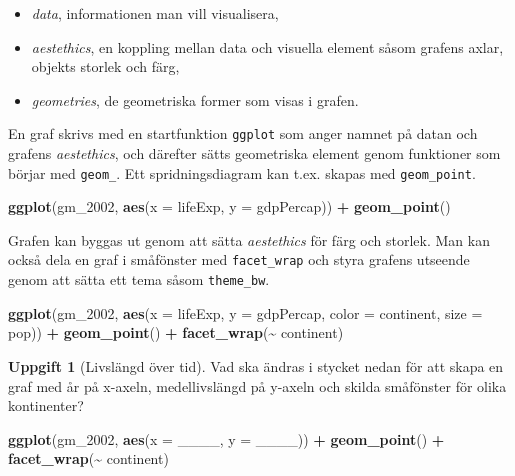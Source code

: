\documentclass[
]{book}
\newenvironment{Shaded}{\begin{snugshade}}{\end{snugshade}}
\newcommand{\AttributeTok}[1]{\textcolor[rgb]{0.13,0.29,0.53}{#1}}
\newcommand{\FunctionTok}[1]{\textcolor[rgb]{0.13,0.29,0.53}{\textbf{#1}}}
\newcommand{\NormalTok}[1]{#1}
\newcommand{\SpecialCharTok}[1]{\textcolor[rgb]{0.81,0.36,0.00}{\textbf{#1}}}
\providecommand{\tightlist}{%
  \setlength{\itemsep}{0pt}\setlength{\parskip}{0pt}}
\theoremstyle{definition}
\theoremstyle{definition}
\theoremstyle{definition}
\newtheorem{exercise}{Uppgift}[chapter]
\theoremstyle{definition}
\theoremstyle{remark}
\begin{document}
\begin{itemize}
\tightlist
\item
  \emph{data}, informationen man vill visualisera,
\item
  \emph{aestethics}, en koppling mellan data och visuella element såsom grafens axlar, objekts storlek och färg,
\item
  \emph{geometries}, de geometriska former som visas i grafen.
\end{itemize}

En graf skrivs med en startfunktion \texttt{ggplot} som anger namnet på datan och grafens \emph{aestethics}, och därefter sätts geometriska element genom funktioner som börjar med \texttt{geom\_}. Ett spridningsdiagram kan t.ex. skapas med \texttt{geom\_point}.

\begin{Shaded}
\begin{Highlighting}[]
\FunctionTok{ggplot}\NormalTok{(gm\_2002, }\FunctionTok{aes}\NormalTok{(}\AttributeTok{x =}\NormalTok{ lifeExp, }\AttributeTok{y =}\NormalTok{ gdpPercap)) }\SpecialCharTok{+} 
  \FunctionTok{geom\_point}\NormalTok{()}
\end{Highlighting}
\end{Shaded}

Grafen kan byggas ut genom att sätta \emph{aestethics} för färg och storlek. Man kan också dela en graf i småfönster med \texttt{facet\_wrap} och styra grafens utseende genom att sätta ett tema såsom \texttt{theme\_bw}.

\begin{Shaded}
\begin{Highlighting}[]
\FunctionTok{ggplot}\NormalTok{(gm\_2002, }\FunctionTok{aes}\NormalTok{(}\AttributeTok{x =}\NormalTok{ lifeExp, }\AttributeTok{y =}\NormalTok{ gdpPercap, }
                    \AttributeTok{color =}\NormalTok{ continent, }\AttributeTok{size =}\NormalTok{ pop)) }\SpecialCharTok{+}
  \FunctionTok{geom\_point}\NormalTok{() }\SpecialCharTok{+}
  \FunctionTok{facet\_wrap}\NormalTok{(}\SpecialCharTok{\textasciitilde{}}\NormalTok{ continent)}
\end{Highlighting}
\end{Shaded}

\begin{exercise}[Livslängd över tid]

Vad ska ändras i stycket nedan för att skapa en graf med år på x-axeln, medellivslängd på y-axeln och skilda småfönster för olika kontinenter?

\begin{Shaded}
\begin{Highlighting}[]
\FunctionTok{ggplot}\NormalTok{(gm\_2002, }\FunctionTok{aes}\NormalTok{(}\AttributeTok{x =}\NormalTok{ \_\_\_\_, }\AttributeTok{y =}\NormalTok{ \_\_\_\_)) }\SpecialCharTok{+} 
  \FunctionTok{geom\_point}\NormalTok{() }\SpecialCharTok{+}
  \FunctionTok{facet\_wrap}\NormalTok{(}\SpecialCharTok{\textasciitilde{}}\NormalTok{ continent)}
\end{Highlighting}
\end{Shaded}

\end{exercise}
\end{document}
